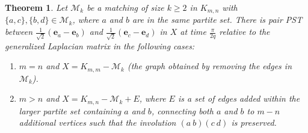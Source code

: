 \documentclass[12pt,a4paper]{article}
\newtheorem{thm}{Theorem}
\begin{document}
\begin{thm}\label{T3}
Let $\mathcal{M}_k$ be a matching of size $k \geq 2$ in $K_{m,n}$ with $\{a,c\},\{b,d\}\in \mathcal{M}_k$, where $a$ and $b$ are in the same partite set. There is pair PST between $\frac{1}{\sqrt{2}}(\mathbf{e}_a - \mathbf{e}_b)$ and $\frac{1}{\sqrt{2}}(\mathbf{e}_c - \mathbf{e}_d)$ in $X$ at time $\frac{\pi}{2q}$ relative to the generalized Laplacian matrix in the following cases:
\begin{enumerate}
    \item $m = n$ and $X=K_{m,m} - \mathcal{M}_k$ (the graph obtained by removing the edges in $\mathcal{M}_k$).
    \item $m > n$ and $X=K_{m,n} - \mathcal{M}_k + E$, where $E$ is a set of edges added within the larger partite set containing $a$ and $b$, connecting both $a$ and $b$ to $m - n$ additional vertices such that the involution $(a~b)(c~d)$ is preserved.
\end{enumerate}
\end{thm}
\end{document}
